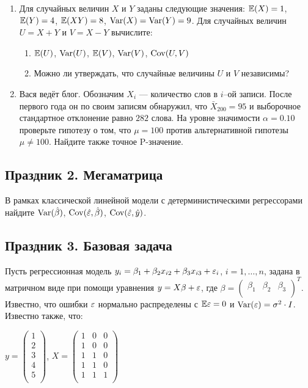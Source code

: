 \documentclass[12pt, a4paper]{article}\usepackage[]{graphicx}\usepackage[]{color}
\begin{document}
\begin{enumerate}
\item Для случайных величин $X$ и $Y$ заданы следующие значения: $\mathbb{E}(X)=1$, $\mathbb{E}(Y)=4$, $\mathbb{E}(XY)=8$, $\operatorname{Var}(X)=\operatorname{Var}(Y)=9$. Для случайных величин $U=X+Y$ и $V=X-Y$ вычислите:
\begin{enumerate}
\item $\mathbb{E}(U)$, $\operatorname{Var}(U)$, $\mathbb{E}(V)$, $\operatorname{Var}(V)$, $\operatorname{Cov}(U,V)$
\item Можно ли утверждать, что случайные величины $U$ и $V$ независимы?
\end{enumerate}

\item Вася ведёт блог. Обозначим $X_i$ — количество слов в $i$--ой записи. После первого года он по своим записям обнаружил, что $\bar{X}_{200}=95$ и выборочное стандартное отклонение равно $282$ слова. На уровне значимости $\alpha=0.10$ проверьте гипотезу о том, что $\mu=100$ против альтернативной гипотезы $\mu\neq 100$. Найдите также точное P-значение.



\end{enumerate}

\subsection{Праздник 2. Мегаматрица}

В рамках классической линейной модели с детерминистическими регрессорами найдите $\operatorname{Var}(\hat{\beta})$, $\operatorname{Cov}(\hat{\varepsilon},\hat{\beta})$, $\operatorname{Cov}(\hat{\varepsilon},\hat{y})$.

\subsection{Праздник 3. Базовая задача}

Пусть регрессионная модель $y_i = \beta_1 + \beta_2 x_{i2} + \beta_3 x_{i3} + \varepsilon_i$, $i = 1, \ldots, n$, задана в матричном виде при помощи уравнения $y = X \beta + \varepsilon$, где $\beta =  \begin{pmatrix}
\beta_1 & \beta_2 & \beta_3\\
\end{pmatrix} ^T$. Известно, что ошибки $\varepsilon$ нормально распределены с $\mathbb{E} \varepsilon = 0$ и $\operatorname{Var} (\varepsilon) = \sigma^2 \cdot I$. Известно также, что:

$y =  \begin{pmatrix}
1 \\
2 \\
3 \\
4 \\
5 \\
\end{pmatrix} $, $X =  \begin{pmatrix}
1 & 0 & 0 \\
1 & 0 & 0 \\
1 & 1 & 0 \\
1 & 1 & 0 \\
1 & 1 & 1 \\
\end{pmatrix} $
\end{document}
